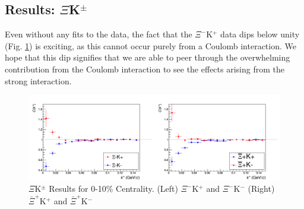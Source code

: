 \documentclass[/home/jesse/Analysis/FemtoAnalysis/AnalysisNotes/AnalysisNoteJBuxton.tex]{subfiles}
\begin{document}
\subsection{Results: \texorpdfstring{$\Xi$K$^{\pm}$}{TEXT}}
\label{ResultsXiK}

Even without any fits to the data, the fact that the $\Xi^{-}$K$^{+}$ data dips below unity (Fig. \ref{fig:XiKchwConjResults}) is exciting, as this cannot occur purely from a Coulomb interaction.  We hope that this dip signifies that we are able to peer through the overwhelming contribution from the Coulomb interaction to see the effects arising from the strong interaction.

\begin{figure}[h]
  \centering
  \includegraphics[width=\textwidth]{7_ResultsAndDiscussion/Figures/cXicKchKStarCfs.png}
  \caption[$\Xi$K$^{\pm}$ Results]{$\Xi$K$^{\pm}$ Results for 0-10\% Centrality.  (Left) $\Xi^{-}$K$^{+}$ and  $\Xi^{-}$K$^{-}$  (Right) $\bar{\Xi}^{+}$K$^{+}$ and  $\bar{\Xi}^{+}$K$^{-}$}
  \label{fig:XiKchwConjResults}
\end{figure}
\end{document}
